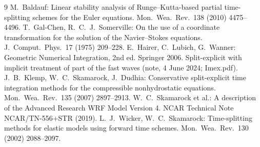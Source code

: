 \documentclass[11pt,a4paper]{article}
\begin{document}
\begin{thebibliography}{9}
 M.~Baldauf: Linear stability analysis of Runge--Kutta-based partial time-splitting
schemes for the Euler equations. Mon.\ Wea.\ Rev.\ 138 (2010) 4475--4496.
 T.~Gal-Chen, R.~C.~J.~Somerville: On the use of a coordinate transformation for the
solution of the Navier--Stokes equations. J.\ Comput.\ Phys.\ 17 (1975) 209--228.
 E.~Hairer, C.~Lubich, G.~Wanner: Geometric Numerical Integration, 2nd ed. Springer
2006.
 Split-explicit with implicit treatment of part of the fast waves (note, 4 June 2024;
Imex.pdf).
 J.~B.~Klemp, W.~C.~Skamarock, J.~Dudhia: Conservative split-explicit time integration
methods for the compressible nonhydrostatic equations. Mon.\ Wea.\ Rev.\ 135 (2007) 2897--2913.
 W.~C.~Skamarock et al.: A description of the Advanced Research WRF Model Version 4.
NCAR Technical Note NCAR/TN-556+STR (2019).
 L.~J.~Wicker, W.~C.~Skamarock: Time-splitting methods for elastic models using forward
time schemes. Mon.\ Wea.\ Rev.\ 130 (2002) 2088--2097.
\end{thebibliography}
\end{document}
